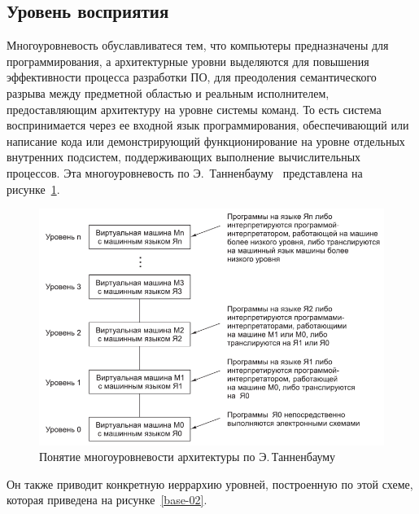 \subsection{Уровень восприятия}

Многоуровневость обуславливатеся тем, что компьютеры предназначены для программирования, а архитектурные уровни выделяются для повышения эффективности процесса разработки ПО, для преодоления семантического разрыва между предметной областью и реальным исполнителем, предоставляющим архитектуру на уровне системы команд. То есть система воспринимается через ее входной язык программирования, обеспечивающий или написание кода или демонстрирующий функционирование на уровне отдельных внутренних подсистем, поддерживающих выполнение вычислительных процессов. Эта многоуровневость по Э.~Танненбауму~\cite{Tannenbaum-2017} представлена на рисунке~\ref{definition-01}.

\begin{figure}[htbp]
  \centering
  \includegraphics[width=1.0\textwidth]{img/definition-01.png}
  \caption{Понятие многоуровневости архитектуры по Э.\,Танненбауму}
  \label{definition-01}
\end{figure}

Он также приводит конкретную иеррархию уровней, построенную по этой схеме, которая приведена на рисунке~\ref{base-02}.

